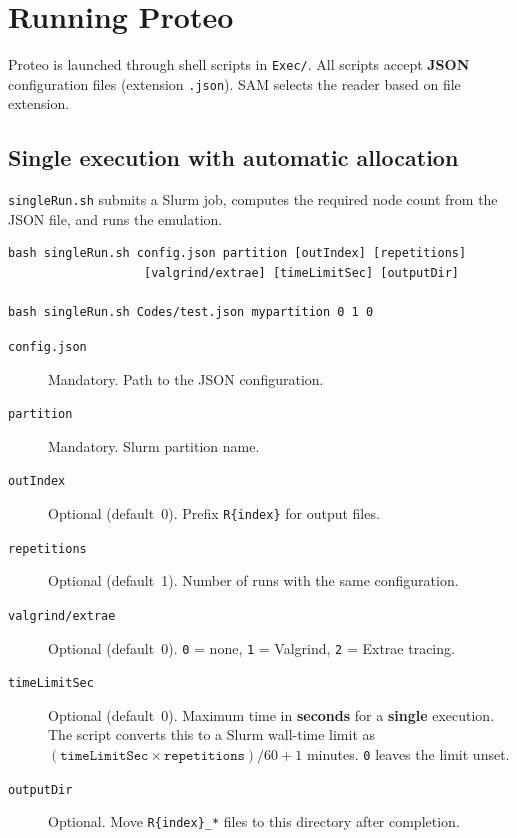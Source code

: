 \section{Running Proteo}
\label{section:usage}

Proteo is launched through shell scripts in \texttt{Exec/}. All scripts accept \textbf{JSON} configuration files (extension \texttt{.json}). SAM selects the reader based on file extension.

\subsection{Single execution with automatic allocation}

\texttt{singleRun.sh} submits a Slurm job, computes the required node count from the JSON file, and runs the emulation.

\begin{lstlisting}[style=bashstyle,caption={singleRun.sh usage.},captionpos=b,label=code:singleRun-usage]
bash singleRun.sh config.json partition [outIndex] [repetitions]
                   [valgrind/extrae] [timeLimitSec] [outputDir]

bash singleRun.sh Codes/test.json mypartition 0 1 0
\end{lstlisting}

\begin{description}
  \item[\texttt{config.json}] Mandatory. Path to the JSON configuration.
  \item[\texttt{partition}] Mandatory. Slurm partition name.
  \item[\texttt{outIndex}] Optional (default~0). Prefix \texttt{R\{index\}} for output files.
  \item[\texttt{repetitions}] Optional (default~1). Number of runs with the same configuration.
  \item[\texttt{valgrind/extrae}] Optional (default~0). \texttt{0} = none, \texttt{1} = Valgrind, \texttt{2} = Extrae tracing.
  \item[\texttt{timeLimitSec}] Optional (default~0). Maximum time in \textbf{seconds} for a \textbf{single} execution. The script converts this to a Slurm wall-time limit as $(\texttt{timeLimitSec} \times \texttt{repetitions}) / 60 + 1$ minutes. \texttt{0} leaves the limit unset.
  \item[\texttt{outputDir}] Optional. Move \texttt{R\{index\}\_*} files to this directory after completion.
\end{description}

